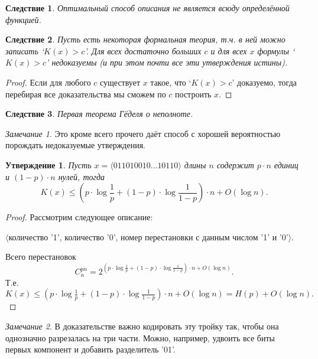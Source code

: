 \documentclass[12pt]{article}
\theoremstyle{definition}
\theoremstyle{plain}
\newtheorem{statement}{Утверждение}[section]
\newtheorem{corollary}{Следствие}[section]
\theoremstyle{remark}
\newtheorem{remark}{Замечание}[section]
\begin{document}
\begin{corollary}
    Оптимальный способ описания не является всюду определённой функцией.
\end{corollary}
\begin{corollary}
    Пусть есть некоторая формальная теория, т.ч. в ней можно записать
    `$K(x)>c$'. Для всех достаточно больших $c$ и для всех $x$ формулы
    `$K(x)>c$' недоказуемы (и при этом почти все эти утверждения истины).
\end{corollary}
\begin{proof}
    Если для любого $c$ существует $x$ такое, что `$K(x)>c$' доказуемо,
    тогда перебирая все доказательства мы сможем по $c$ построить $x$.
\end{proof}
\begin{corollary}
    Первая теорема Гёделя о неполноте.
\end{corollary}
\begin{remark}
    Это кроме всего прочего даёт способ с хорошей вероятностью порождать недоказуемые
    утверждения.
\end{remark}

\begin{statement}\label{st:kologorov:entropy}
Пусть $x = \langle{011010010\dotso 10110}\rangle$ длины $n$ содержит
$p\cdot n$ единиц и $(1-p)\cdot n$ нулей, тогда 
\[
    K(x)\le \left(p\cdot\log\frac1p + (1-p)\cdot\log\frac{1}{1-p}\right)\cdot n
        + O(\log n).
\]
\end{statement}
\begin{proof}
    Рассмотрим следующее описание:
    \begin{center}
    $\langle$количество '1', количество '0', номер перестановки с данным числом '1' и '0'$\rangle$.
    \end{center}
Всего перестановок 
    \[
        C_{n}^{pn} = 2^{\left(p\cdot\log\frac1p +
        (1-p)\cdot\log\frac{1}{1-p}\right)\cdot n + O(\log n)}.
    \]
    Т.е. $K(x)\le \left(p\cdot\log\frac1p +
        (1-p)\cdot\log\frac{1}{1-p}\right)\cdot n + O(\log n) = H(p) + O(\log n).$
\end{proof}
\begin{remark}
    В доказательстве важно кодировать эту тройку так, чтобы она однозначно
    разрезалась на три части. Можно, например, удвоить все биты первых
    компонент и добавить разделитель '01'.
\end{remark}
\end{document}
